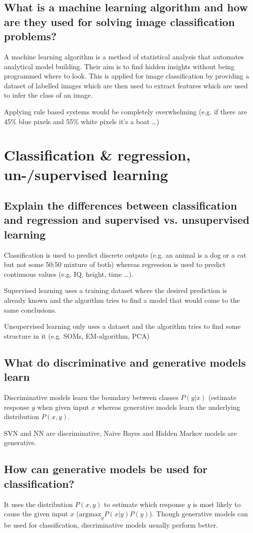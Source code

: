 \subsection{What is a machine learning algorithm and how are they used for solving image classification problems?}
A machine learning algorithm is a method of statistical analysis that automates analytical model building. Their aim is to find hidden insights without being programmed where to look. 
This is applied for image classification by providing a dataset of labelled images which are then used to extract features which are used to infer the class of an image. 

Applying rule based systems would be completely overwhelming (e.g. if there are 45\% blue pixels and 55\% white pixels it's a boat \ldots)
%
\section[Regression, (un)supervised]{Classification \& regression, un-/supervised learning}
\subsection{Explain the differences between classification and regression and supervised vs. unsupervised learning}
Classification is used to predict discrete outputs (e.g. an animal is a dog or a cat but not some 50:50 mixture of both) whereas regression is used to predict continuous values (e.g. IQ, height, time \ldots).

Supervised learning uses a training dataset where the desired prediction is already known and the algorithm tries to find a model that would come to the same conclusions. 

Unsupervised learning only uses a dataset and the algorithm tries to find some structure in it (e.g. SOMs, EM-algorithm, PCA)
\subsection{What do discriminative and generative models learn }
Discriminative models learn the boundary between classes $P(y|x)$ (estimate response $y$ when given input $x$ whereas generative models learn the underlying distribution $P(x,y)$.

SVN and NN are discriminative, Naive Bayes and Hidden Markov models are generative.
\subsection{How can generative models be used for classification?}
It uses the distribution $P(x,y)$ to estimate which response $y$ is most likely to cause the given input $x$ ($\text{argmax}_y P(x|y)P(y)$). Though generative models can be used for classification, discriminative models usually perform better. 
%
